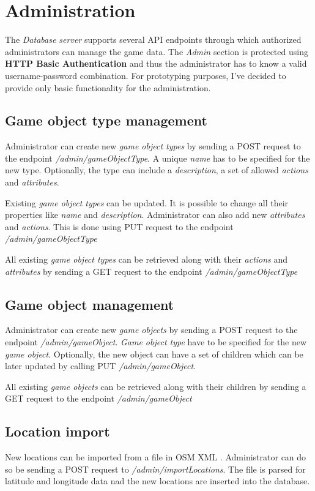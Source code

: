 \section{Administration}
The \textit{Database server} supports several API endpoints through which authorized administrators can manage the game data. The \textit{Admin} section is protected using \textbf{HTTP Basic Authentication} and thus the administrator has to know a valid username-password combination. For prototyping purposes, I've decided to provide only basic functionality for the administration.

	\subsection{Game object type management}
	Administrator can create new \textit{game object types} by sending a POST request to the endpoint \mbox{\textit{/admin/gameObjectType}}. A unique \textit{name} has to be specified for the new type. Optionally, the type can include a \textit{description}, a set of allowed \textit{actions} and \textit{attributes}.
	
	Existing \textit{game object types} can be updated. It is possible to change all their properties like \textit{name} and \textit{description}. Administrator can also add new \textit{attributes} and \textit{actions}. This is done using PUT request to the endpoint \mbox{\textit{/admin/gameObjectType}}
		
	All existing \textit{game object types} can be retrieved along with their \textit{actions} and \textit{attributes} by sending a GET request to the endpoint \mbox{\textit{/admin/gameObjectType}}
	
	\subsection{Game object management}
	Administrator can create new \textit{game objects} by sending a POST request to the endpoint \mbox{\textit{/admin/gameObject}}. \textit{Game object type} have to be specified for the new \textit{game object}. Optionally, the new object can have a set of children which can be later updated by calling PUT \mbox{\textit{/admin/gameObject}}.
	
	All existing \textit{game objects} can be retrieved along with their children by sending a GET request to the endpoint \mbox{\textit{/admin/gameObject}}
	
	\subsection{Location import}
	New locations can be imported from a file in OSM XML \cite{osmxml}. Administrator can do so be sending a POST request to \mbox{\textit{/admin/importLocations}}. The file is parsed for latitude and longitude data nad the new locations are inserted into the database.
	
